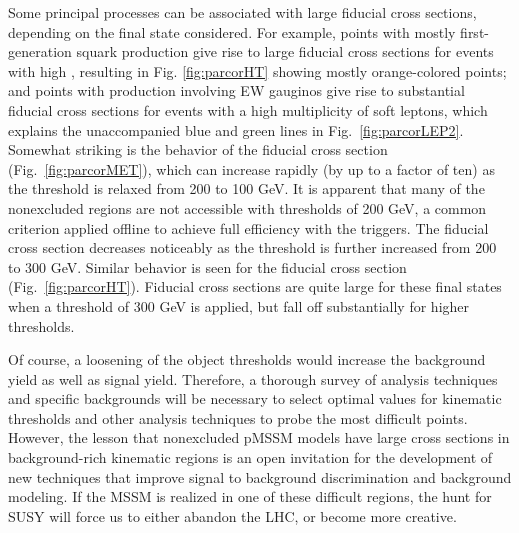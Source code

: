 Some principal processes can be associated with large fiducial
cross sections, depending on the final state considered. For example, points with mostly
first-generation squark production give rise to large
fiducial cross sections for events with high \HT{}, resulting in Fig.
\ref{fig:parcorHT} showing mostly orange-colored points; and points with production involving EW gauginos give rise to substantial
fiducial cross sections for events with a high multiplicity of soft leptons, which
explains the unaccompanied blue and green lines in Fig.~\ref{fig:parcorLEP2}.  Somewhat striking is the behavior of the \MET{} fiducial cross section
(Fig.~\ref{fig:parcorMET}), which can increase rapidly (by up to a
factor of ten) as the threshold
is relaxed from 200 to 100 GeV. It is apparent that many of the
nonexcluded regions are not accessible with thresholds of 200 GeV, 
a common criterion applied offline to achieve full efficiency
with the triggers. The fiducial cross section decreases noticeably as the
threshold is further increased from 200 to 300 GeV. Similar behavior is seen for the \HT{} fiducial cross section
(Fig.~\ref{fig:parcorHT}). Fiducial cross
sections are quite large for these final states when a
threshold of 300 GeV is applied, but fall off substantially for higher
thresholds. 

Of course, a loosening of the object thresholds would increase the background yield as well as signal yield. Therefore, a thorough survey of analysis techniques and specific backgrounds will be necessary 
to select optimal values for kinematic thresholds and other analysis techniques to probe the most difficult points. However, the lesson that nonexcluded pMSSM models have large cross sections in background-rich kinematic regions is an open invitation for the development of new techniques that improve signal to background discrimination and background modeling. If the MSSM is realized in one of these difficult regions, the hunt for SUSY will force us to either abandon the LHC, or become more creative. 

